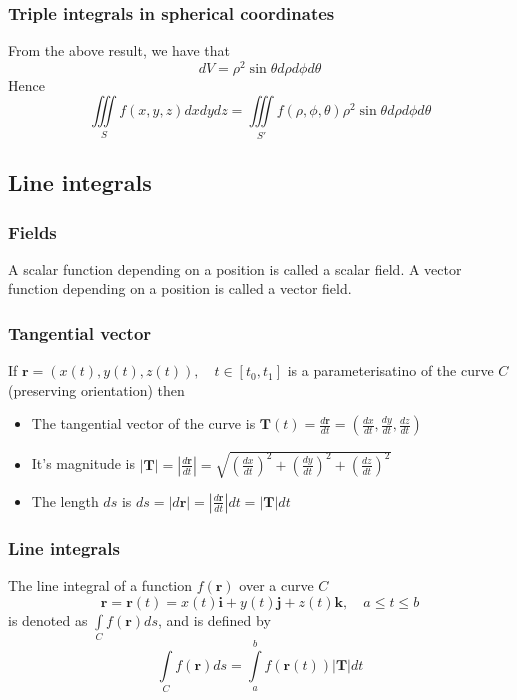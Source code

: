 \documentclass[12pt]{article}
\begin{document}
		\subsubsection{Triple integrals in spherical coordinates}
		From the above result, we have that
		\[
			dV = \rho^2 \sin{\theta} d\rho d\phi d\theta
		\]
		Hence
		\[
			\iiint\limits_S f(x,y,z) dxdydz = \iiint\limits_{S'} f( \rho, \phi, \theta) \rho^2 \sin{\theta} d\rho d\phi d\theta
		\]
		
	\subsection{Line integrals}
		\subsubsection{Fields}
		\begin{defn}
			A scalar function depending on a position is called a scalar field. A vector function depending on a position is called a vector field.
		\end{defn}
		
		\subsubsection{Tangential vector}
		If $\mathbf{r} = (x(t), y(t), z(t)), \quad t \in [t_0, t_1]$ is a parameterisatino of the curve $C$ (preserving orientation) then
		\begin{itemize}
			\item The tangential vector of the curve is $\mathbf{T}(t) = \frac{d\mathbf{r}}{dt} = \left( \frac{dx}{dt}, \frac{dy}{dt}, \frac{dz}{dt} \right)$
			\item It's magnitude is $\left| \mathbf{T} \right| = \left| \frac{d\mathbf{r}}{dt} \right| = \sqrt{ \left( \frac{dx}{dt} \right)^2 + \left( \frac{dy}{dt} \right)^2 + \left( \frac{dz}{dt} \right)^2   }$
			\item The length $ds$ is $ds = \left| d\mathbf{r} \right| = \left| \frac{d\mathbf{r}}{dt} \right|dt = \left| \mathbf{T} \right| dt$
		\end{itemize}
		
		\subsubsection{Line integrals}
		\begin{defn}
			The line integral of a function $f(\mathbf{r})$ over a curve $C$
			\[
				\mathbf{r} = \mathbf{r}(t) = x(t)\mathbf{i} + y(t)\mathbf{j} + z(t)\mathbf{k}, \quad a \le t \le b
			\]
			is denoted as $\int\limits_C f(\mathbf{r}) ds$, and is defined by
			\[
				\int\limits_C f(\mathbf{r}) ds = \int\limits_a^b f(\mathbf{r}(t))|\mathbf{T}|dt
			\]
		\end{defn}
		
\end{document}
